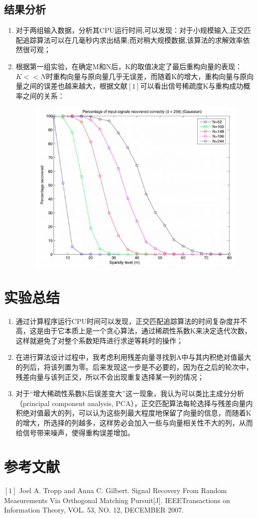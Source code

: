 \documentclass{article}
\begin{document}
\subsection{结果分析}
\begin{enumerate}[1)]
	\item 对于两组输入数据，分析其CPU运行时间,可以发现：对于小规模输入,正交匹配追踪算法可以在几毫秒内求出结果;而对稍大规模数据,该算法的求解效率依然很可观；
	\item 根据第一组实验，在确定M和N后，K的取值决定了最后重构向量的表现：$ K<<N $时重构向量与原向量几乎无误差，而随着K的增大，重构向量与原向量之间的误差也越来越大，根据文献$ [1] $可以看出信号稀疏度K与重构成功概率之间的关系：
	\begin{figure}[H]
		\centering
		\includegraphics[scale=0.6]{1.png}
	\end{figure}
\end{enumerate}

\section{实验总结}
\begin{enumerate}[1)]
	\item 通过计算程序运行CPU时间可以发现，正交匹配追踪算法的时间复杂度并不高，这是由于它本质上是一个贪心算法，通过稀疏性系数K来决定迭代次数，这样就避免了对整个系数矩阵进行求逆等耗时的操作；
	\item 在进行算法设计过程中，我考虑利用残差向量寻找到A中与其内积绝对值最大的列后，将该列置为零。后来发现这一步是不必要的，因为在之后的轮次中，残差向量与该列正交，所以不会出现重复选择某一列的情况；
	\item 对于“增大稀疏性系数K后误差变大”这一现象，我认为可以类比主成分分析（principal component analysis, PCA），正交匹配算法每轮选择与残差向量内积绝对值最大的列，可以认为这些列最大程度地保留了向量的信息，而随着K的增大，所选择的列越多，这样势必会加入一些与向量相关性不大的列，从而给信号带来噪声，使得重构误差增加。	
\end{enumerate}

\section{参考文献}
	$ [1] $ Joel A. Tropp and Anna C. Gilbert. Signal Recovery From Random Measurements Via Orthogonal Matching Pursuit[J]. IEEETransactions on Information Theory, VOL. 53, NO. 12, DECEMBER 2007.
\end{document}
